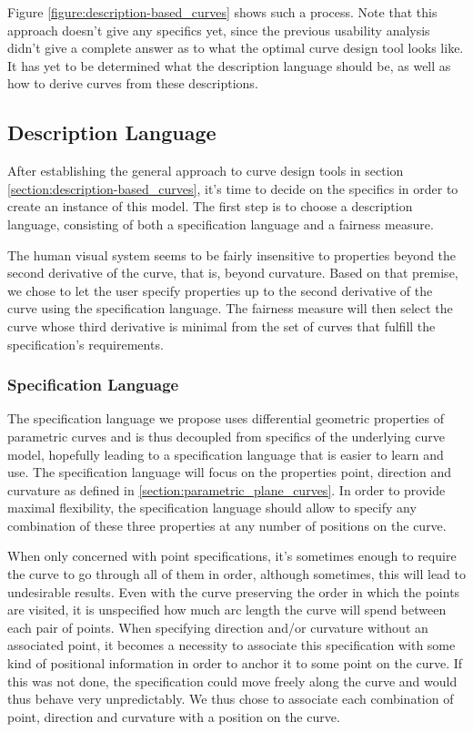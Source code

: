 \documentclass[a4paper]{article}
\begin{document}
			Figure \ref{figure:description-based_curves} shows such a process. Note that this approach doesn't give any specifics yet, since the previous usability analysis didn't give a complete answer as to what the optimal curve design tool looks like. It has yet to be determined what the description language should be, as well as how to derive curves from these descriptions.

		\subsection{Description Language}
		\label{section:description_language}
			
			After establishing the general approach to curve design tools in section \ref{section:description-based_curves}, it's time to decide on the specifics in order to create an instance of this model. The first step is to choose a description language, consisting of both a specification language and a fairness measure.

			The human visual system seems to be fairly insensitive to properties beyond the second derivative of the curve, that is, beyond curvature. Based on that premise, we chose to let the user specify properties up to the second derivative of the curve using the specification language. The fairness measure will then select the curve whose third derivative is minimal from the set of curves that fulfill the specification's requirements.

			\subsubsection{Specification Language}
			\label{section:specification_language}

				The specification language we propose uses differential geometric properties of parametric curves and is thus decoupled from specifics of the underlying curve model, hopefully leading to a specification language that is easier to learn and use. The specification language will focus on the properties point, direction and curvature as defined in \ref{section:parametric_plane_curves}. In order to provide maximal flexibility, the specification language should allow to specify any combination of these three properties at any number of positions on the curve.

				When only concerned with point specifications, it's sometimes enough to require the curve to go through all of them in order, although sometimes, this will lead to undesirable results. Even with the curve preserving the order in which the points are visited, it is unspecified how much arc length the curve will spend between each pair of points. When specifying direction and/or curvature without an associated point, it becomes a necessity to associate this specification with some kind of positional information in order to anchor it to some point on the curve. If this was not done, the specification could move freely along the curve and would thus behave very unpredictably. We thus chose to associate each combination of point, direction and curvature with a position on the curve.
\end{document}

